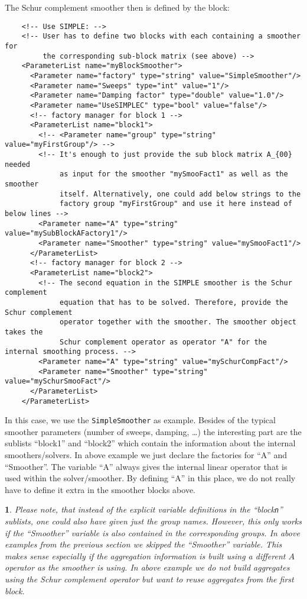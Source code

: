 \documentclass[10pt,fleqn]{book}
\newtheorem*{mycomment}{\ding{42}}
\begin{document}
The Schur complement smoother then is defined by the block:

\begin{lstlisting}
    <!-- Use SIMPLE: -->
    <!-- User has to define two blocks with each containing a smoother for
         the corresponding sub-block matrix (see above) -->
    <ParameterList name="myBlockSmoother">
      <Parameter name="factory" type="string" value="SimpleSmoother"/>
      <Parameter name="Sweeps" type="int" value="1"/>
      <Parameter name="Damping factor" type="double" value="1.0"/>
      <Parameter name="UseSIMPLEC" type="bool" value="false"/>
      <!-- factory manager for block 1 -->
      <ParameterList name="block1">
        <!-- <Parameter name="group" type="string" value="myFirstGroup"/> -->
        <!-- It's enough to just provide the sub block matrix A_{00} needed 
             as input for the smoother "mySmooFact1" as well as the smoother 
             itself. Alternatively, one could add below strings to the
             factory group "myFirstGroup" and use it here instead of below lines -->
        <Parameter name="A" type="string" value="mySubBlockAFactory1"/>
        <Parameter name="Smoother" type="string" value="mySmooFact1"/>
      </ParameterList>
      <!-- factory manager for block 2 -->
      <ParameterList name="block2">
        <!-- The second equation in the SIMPLE smoother is the Schur complement
             equation that has to be solved. Therefore, provide the Schur complement 
             operator together with the smoother. The smoother object takes the 
             Schur complement operator as operator "A" for the internal smoothing process. -->
        <Parameter name="A" type="string" value="mySchurCompFact"/>
        <Parameter name="Smoother" type="string" value="mySchurSmooFact"/>
      </ParameterList>
    </ParameterList>
\end{lstlisting}

In this case, we use the \texttt{SimpleSmoother} as example. Besides of the typical smoother parameters (number of sweeps, damping, \ldots) the interesting part are the sublists ``block1'' and ``block2'' which contain the information about the internal smoothers/solvers. In above example we just declare the factories for ``A'' and ``Smoother''. The variable ``A'' always gives the internal linear operator that is used within the solver/smoother. By defining ``A'' in this place, we do not really have to define it extra in the smoother blocks above.

\begin{mycomment}
Please note, that instead of the explicit variable definitions in the ``block\texttt{n}'' sublists, one could also have given just the group names. However, this only works if the ``Smoother'' variable is also contained in the corresponding groups. In above examples from the previous section we skipped the ``Smoother'' variable. This makes sense especially if the aggregation information is built using a different $A$ operator as the smoother is using. In above example we do not build aggregates using the Schur complement operator but want to reuse aggregates from the first block.
\end{mycomment}
\end{document}
